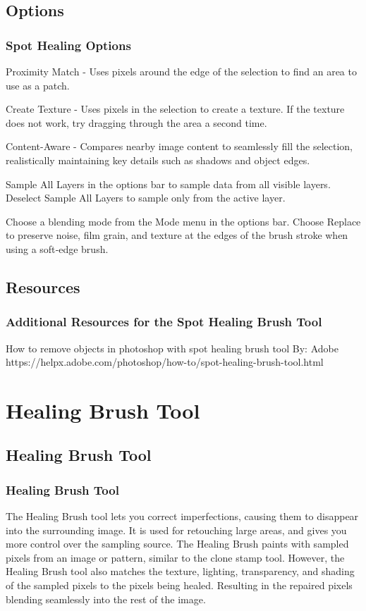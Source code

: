 \documentclass{beamer}
\begin{document}
\subsection{Options}		
\begin{frame}
	\frametitle{Spot Healing Options}
	\begin{outline}
		\1 Proximity Match - 
		\2 Uses pixels around the edge of the selection to find an area to use as a patch.
		
		\1 Create Texture - 
		\2 Uses pixels in the selection to create a texture. If the texture does not work, try dragging through the area a second time.
		
		\1 Content-Aware - 
		\2 Compares nearby image content to seamlessly fill the selection, realistically maintaining key details such as shadows and object edges.
		
		\1 Sample All Layers in the options bar to sample data from all visible layers. 
		\2 Deselect Sample All Layers to sample only from the active layer.
		
		\1 Choose a blending mode from the Mode menu in the options bar. 
		\2 Choose Replace to preserve noise, film grain, and texture at the edges of the brush stroke when using a soft‑edge brush.
	\end{outline}
\end{frame}

\subsection{Resources}		
\begin{frame}
	\frametitle{Additional Resources for the Spot Healing Brush Tool}
	\begin{outline}
		\1 How to remove objects in photoshop with spot healing brush tool
		\2 By:  Adobe
		\2 https://helpx.adobe.com/photoshop/how-to/spot-healing-brush-tool.html
	\end{outline}
\end{frame}


\section{Healing Brush Tool}
\subsection{Healing Brush Tool}		
\begin{frame}
	\frametitle{Healing Brush Tool}
	\begin{outline}
		\1 The Healing Brush tool lets you correct imperfections, causing them to disappear into the surrounding image. 
		\1 It is used for retouching large areas, and gives you more control over the sampling source.
		\1 The Healing Brush paints with sampled pixels from an image or pattern, similar to the clone stamp tool. 
		\2 However, the Healing Brush tool also matches the texture, lighting, transparency, and shading of the sampled pixels to the pixels being healed.
		\2 Resulting in the repaired pixels blending seamlessly into the rest of the image.
		\1 
	\end{outline}
\end{frame}
\end{document}
